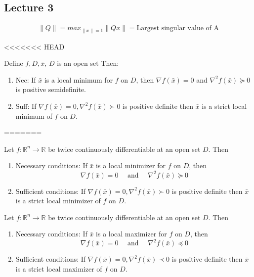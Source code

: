 
% 
\subsection{Lecture 3}

\begin{definition}
    \begin{align*}
        \|Q\|=max_{\|x\|=1}\|Qx\|= \text{Largest singular value of A}
    \end{align*}
\end{definition}

<<<<<<< HEAD
\begin{definition}
    Define $f,D,\bar{x}$, $D$ is an open set
    Then:
    \begin{enumerate}
        \item Nec: If $\bar{x}$ is a local minimum for $f$ on $D$, then $\nabla f(\bar{x})=0$ and $\nabla^2f(\bar{x}) \succeq 0
        $ is positive semidefinite.
        \item Suff: If $\nabla f(\bar{x})=0,\nabla^2f(\bar{x}) \succ 0
        $ is positive definite then $\bar{x}$ is a strict local minimum of $f$ on $D$.
    \end{enumerate}
\end{definition}
=======
\begin{theorem}
  Let $f: \mathbb R^n \to \mathbb R$ be twice continuously differentiable at an open set $D$. Then
  \begin{enumerate}
    \item Necessary conditions: If $\bar{x}$ is a local minimizer for $f$ on $D$, then $$\nabla f(\bar{x})=0 \quad \text{ and } \quad \nabla^2f(\bar{x}) \succeq 0
    $$
    \item Sufficient conditions: If $\nabla f(\bar{x})=0,\nabla^2f(\bar{x}) \succ 0$ is positive definite then $\bar{x}$ is a strict local minimizer of $f$ on $D$.
  \end{enumerate}
\end{theorem}
\begin{theorem}
  Let $f: \mathbb R^n \to \mathbb R$ be twice continuously differentiable at an open set $D$. Then
  \begin{enumerate}
    \item Necessary conditions: If $\bar{x}$ is a local maximizer for $f$ on $D$, then $$\nabla f(\bar{x})=0 \quad \text{ and } \quad \nabla^2f(\bar{x}) \preceq 0
    $$
    \item Sufficient conditions: If $\nabla f(\bar{x})=0,\nabla^2f(\bar{x}) \prec 0$ is positive definite then $\bar{x}$ is a strict local maximizer of $f$ on $D$.
  \end{enumerate}
\end{theorem}
